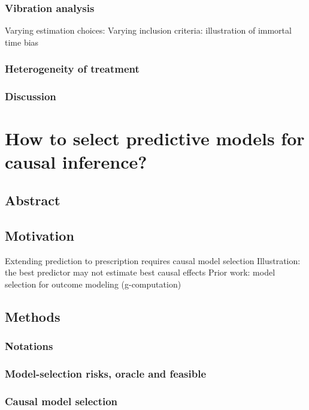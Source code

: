 \documentclass{report}
\begin{document}
\subsection{Vibration analysis}
Varying estimation choices:
Varying inclusion criteria: illustration of immortal time bias
\subsection{Heterogeneity of treatment}

\subsection{Discussion}\label{subsec:causal_tuto:discussion}

\chapter{How to select predictive models for causal inference?}\label{chapter:causal_model_selection}
\section{Abstract}\label{sec:causal_model_selection:abstract}

\section{Motivation}\label{sec:causal_model_selection:motivation}

Extending prediction to prescription requires causal model selection
Illustration: the best predictor may not estimate best causal effects
Prior work: model selection for outcome modeling (g-computation)
\section{Methods}\label{sec:causal_model_selection:methods}


\subsection{Notations}\label{subsec:causal_model_selection:notations}

\subsection{Model-selection risks, oracle and feasible}\label{subsec:causal_model_selection:risks}
\subsection{Causal model selection}\label{subsec:causal_model_selection:causal_model_selection}
\end{document}
